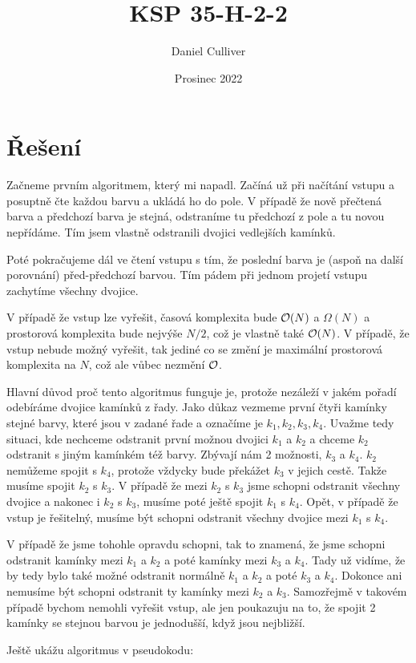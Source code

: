 \documentclass{../../../ksp}
\title{KSP 35-H-2-2}
\author{Daniel Culliver}
\date{Prosinec 2022}
\begin{document}
\maketitle

\section*{Řešení}
Začneme prvním algoritmem, který mi napadl. Začíná už při načítání vstupu a posuptně čte každou barvu
a ukládá ho do pole. V případě že nově přečtená barva a předchozí barva je stejná, odstraníme tu předchozí z pole
a tu novou nepřídáme. Tím jsem vlastně odstranili dvojici vedlejších kamínků.

Poté pokračujeme dál ve čtení vstupu s tím, že poslední barva je (aspoň na další porovnání) před-předchozí barvou.
Tím pádem při jednom projetí vstupu zachytíme všechny dvojice.

V případě že vstup lze vyřešit, časová komplexita bude $\mathcal{O}(N)$ a $\Omega(N)$ a prostorová komplexita
bude nejvýše $N/2$, což je vlastně také $\mathcal{O}(N)$.
V případě, že vstup nebude možný vyřešit, tak jediné co se změní je maximální prostorová komplexita na $N$,
což ale vůbec nezmění $\mathcal{O}$.

Hlavní důvod proč tento algoritmus funguje je, protože nezáleží v jakém pořadí odebíráme dvojice kamínků z řady.
Jako důkaz vezmeme první čtyři kamínky stejné barvy, které jsou v zadané řade a označíme je $k_1, k_2, k_3, k_4$.
Uvažme tedy situaci, kde nechceme odstranit první možnou dvojici $k_1$ a $k_2$
a chceme $k_2$ odstranit s jiným kamínkém též barvy. Zbývají nám 2 možnosti, $k_3$ a $k_4$. $k_2$ nemůžeme spojit s $k_4$,
protože vždycky bude překážet $k_3$ v jejich cestě. Takže musíme spojit $k_2$ s $k_3$. V případě že mezi $k_2$ s $k_3$ jsme schopni
odstranit všechny dvojice a nakonec i $k_2$ s $k_3$, musíme poté ještě spojit $k_1$ s $k_4$. Opět, v případě že vstup je řešitelný,
musíme být schopni odstranit všechny dvojice mezi $k_1$ s $k_4$.

V případě že jsme tohohle opravdu schopni, tak to znamená,
že jsme schopni odstranit kamínky mezi $k_1$ a $k_2$ a poté kamínky mezi $k_3$ a $k_4$. Tady už vidíme, že by tedy bylo také možné
odstranit normálně $k_1$ a $k_2$ a poté $k_3$ a $k_4$. Dokonce ani nemusíme být schopni odstranit ty kamínky mezi
$k_2$ a $k_3$. Samozřejmě v takovém případě bychom nemohli vyřešit vstup, ale jen poukazuju na to, že spojit 2 kamínky se stejnou barvou
je jednodušší, když jsou nejbližší.

Ještě ukážu algoritmus v pseudokodu:
\end{document}
